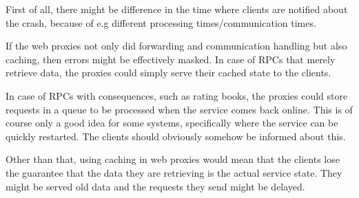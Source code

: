 \documentclass[11pt]{article}
\begin{document}
\begin{enumerate}
    First of all, there might be difference in the time where clients are
    notified about the crash, because of e.g different processing
    times/communication times.

    If the web proxies not only did forwarding and communication handling but
    also caching, then errors might be effectively masked. In case of RPCs that
    merely retrieve data, the proxies could simply serve their cached state to
    the clients.

    In case of RPCs with consequences, such as rating books, the proxies could
    store requests in a queue to be processed when the service comes back
    online. This is of course only a good idea for some systems, specifically
    where the service can be quickly restarted. The clients should obviously
    somehow be informed about this.

    Other than that, using caching in web proxies would mean that the clients
    lose the guarantee that the data they are retrieving is the actual service
    state. They might be served old data and the requests they send might be
    delayed.
\end{enumerate}
\end{document}
